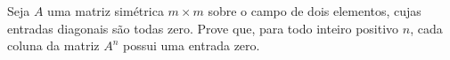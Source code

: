Seja \(A\) uma matriz simétrica \(m \times m\) sobre o campo de dois elementos, cujas entradas diagonais são todas zero. Prove que, para todo inteiro positivo \(n\), cada coluna da matriz \(A^n\) possui uma entrada zero.
